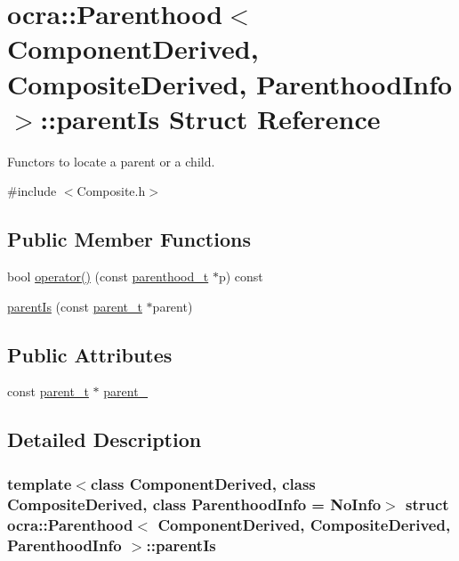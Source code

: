 \hypertarget{structocra_1_1Parenthood_1_1parentIs}{}\section{ocra\+:\+:Parenthood$<$ Component\+Derived, Composite\+Derived, Parenthood\+Info $>$\+:\+:parent\+Is Struct Reference}
\label{structocra_1_1Parenthood_1_1parentIs}


Functors to locate a parent or a child.  




{\ttfamily \#include $<$Composite.\+h$>$}

\subsection*{Public Member Functions}
\begin{DoxyCompactItemize}
\item 
bool \hyperlink{structocra_1_1Parenthood_1_1parentIs_ad780e02e2e27c53bff75fb0ab0ea245e}{operator()} (const \hyperlink{classocra_1_1Parenthood_acdae20cb747190b5dc9dbe42290bde78}{parenthood\+\_\+t} $\ast$p) const
\item 
\hyperlink{structocra_1_1Parenthood_1_1parentIs_ada25b4ec30bebc7ca18b9c548e27a94f}{parent\+Is} (const \hyperlink{classocra_1_1Parenthood_a2f95265c57cf96bbc26afee2ac757dd6}{parent\+\_\+t} $\ast$parent)
\end{DoxyCompactItemize}
\subsection*{Public Attributes}
\begin{DoxyCompactItemize}
\item 
const \hyperlink{classocra_1_1Parenthood_a2f95265c57cf96bbc26afee2ac757dd6}{parent\+\_\+t} $\ast$ \hyperlink{structocra_1_1Parenthood_1_1parentIs_a1c5033667c6742b8f4ba326918eb1f4d}{parent\+\_\+}
\end{DoxyCompactItemize}


\subsection{Detailed Description}
\subsubsection*{template$<$class Component\+Derived, class Composite\+Derived, class Parenthood\+Info = No\+Info$>$\newline
struct ocra\+::\+Parenthood$<$ Component\+Derived, Composite\+Derived, Parenthood\+Info $>$\+::parent\+Is}

